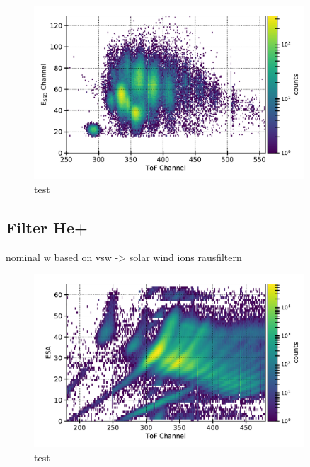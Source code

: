 \begin{figure}[h]
	\includegraphics[width=0.9\textwidth]{Figures/et_matrix.pdf}
	\centering
	\caption{test}
	\label{fig:et_matrix}
\end{figure}


\subsection{Filter He+}
nominal w based on vsw -> solar wind ions rausfiltern
\begin{figure}[h]
	\includegraphics[width=0.9\textwidth]{Figures/epq_all.pdf}
	\centering
	\caption{test}
	\label{fig:epq_all}
\end{figure}


